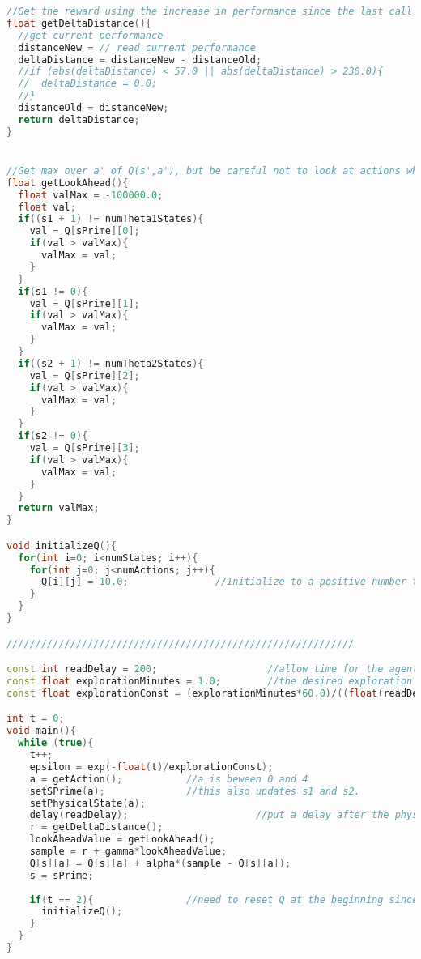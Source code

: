 \documentclass[12pt]{article}
\begin{document}
{\begin{lstlisting}[language=C++, caption=C++ code]
//Get the reward using the increase in performance since the last call
float getDeltaDistance(){
  //get current performance
  distanceNew = // read current performance
  deltaDistance = distanceNew - distanceOld;
  //if (abs(deltaDistance) < 57.0 || abs(deltaDistance) > 230.0){         //don't count noise
  //  deltaDistance = 0.0;
  //}
  distanceOld = distanceNew;
  return deltaDistance;
}


//Get max over a' of Q(s',a'), but be careful not to look at actions which take the agent outside of the allowed state space
float getLookAhead(){
  float valMax = -100000.0;
  float val;
  if((s1 + 1) != numTheta1States){
    val = Q[sPrime][0];
    if(val > valMax){
      valMax = val;
    }
  }
  if(s1 != 0){
    val = Q[sPrime][1];
    if(val > valMax){
      valMax = val;
    }
  }
  if((s2 + 1) != numTheta2States){
    val = Q[sPrime][2];
    if(val > valMax){
      valMax = val;
    }
  }
  if(s2 != 0){
    val = Q[sPrime][3];
    if(val > valMax){
      valMax = val;
    }
  }
  return valMax;
}

void initializeQ(){
  for(int i=0; i<numStates; i++){
    for(int j=0; j<numActions; j++){
      Q[i][j] = 10.0;               //Initialize to a positive number to represent optimism over all state-actions
    }
  }
}

////////////////////////////////////////////////////////////

const int readDelay = 200;                   //allow time for the agent to execute after it sets its physical state
const float explorationMinutes = 1.0;        //the desired exploration time in minutes 
const float explorationConst = (explorationMinutes*60.0)/((float(readDelay))/1000.0);  //this is the approximate exploration time in units of number of times through the loop

int t = 0;
void main(){
  while (true){
    t++;
    epsilon = exp(-float(t)/explorationConst);
    a = getAction();           //a is beween 0 and 4
    setSPrime(a);              //this also updates s1 and s2.
    setPhysicalState(a);
    delay(readDelay);                      //put a delay after the physical action occurs so the agent has some delay between two performance reads 
    r = getDeltaDistance();
    lookAheadValue = getLookAhead();
    sample = r + gamma*lookAheadValue;
    Q[s][a] = Q[s][a] + alpha*(sample - Q[s][a]);
    s = sPrime;
    
    if(t == 2){                //need to reset Q at the beginning since a spurious value may arise at the first initialization
      initializeQ();
    }
  }  
}

\end{lstlisting}
}
\end{document}
